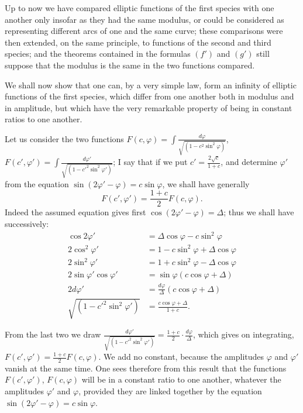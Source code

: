 \documentclass{article}
\begin{document}
Up to now we have compared elliptic functions of the first species with one another only insofar as they had the same modulus, or could be considered as representing different arcs of one and the same curve; these comparisons were then extended, on the same principle, to functions of the second and third species; and the theorems contained in the formulas $(f')$ and $(g')$ still suppose that the modulus is the same in the two functions compared.

We shall now show that one can, by a very simple law, form an infinity of elliptic functions of the first species, which differ from one another both in modulus and in amplitude, but which have the very remarkable property of being in constant ratios to one another.

Let us consider the two functions $F(c,\varphi)=\displaystyle\int\frac{d\varphi}{\sqrt{(1-c^{2}\sin^{2}\varphi)}}$, $F(c',\varphi')=\displaystyle\int\frac{d\varphi'}{\sqrt{(1-c'^{2}\sin^{2}\varphi')}}$; I say that if we put $c'=\frac{2\sqrt{c}}{1+c}$, and determine $\varphi'$ from the equation $\sin(2\varphi'-\varphi)=c\sin\varphi$, we shall have generally
\[ F(c',\varphi')=\frac{1+c}{2}F(c,\varphi). \]
Indeed the assumed equation gives first $\cos(2\varphi'-\varphi)=\Delta$; thus we shall have successively:
\[ \begin{aligned} \cos2\varphi'&=\Delta\cos\varphi-c\sin^{2}\varphi\\ 2\cos^{2}\varphi'&=1-c\sin^{2}\varphi+\Delta\cos\varphi\\ 2\sin^{2}\varphi'&=1+c\sin^{2}\varphi-\Delta\cos\varphi\\ 2\sin\varphi'\cos\varphi'&=\sin\varphi(c\cos\varphi+\Delta)\\ 2d\varphi'&=\frac{d\varphi}{\Delta}(c\cos\varphi+\Delta)\\ \sqrt{(1-c'^{2}\sin^{2}\varphi')}&=\frac{c\cos\varphi+\Delta}{1+c}. \end{aligned} \]

From the last two we draw $\frac{d\varphi'}{\sqrt{(1-c'^{2}\sin^{2}\varphi')}}=\frac{1+c}{2}\cdot\frac{d\varphi}{\Delta}$, which gives on integrating, $F(c',\varphi')=\frac{1+c}{2}F(c,\varphi)$. We add no constant, because the amplitudes $\varphi$ and $\varphi'$ vanish at the same time. One sees therefore from this result that the functions $F(c',\varphi')$, $F(c,\varphi)$ will be in a constant ratio to one another, whatever the amplitudes $\varphi'$ and $\varphi$, provided they are linked together by the equation $\sin(2\varphi'-\varphi)=c\sin\varphi$.
\end{document}
